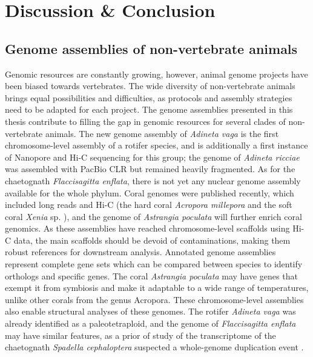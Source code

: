 \chapter{Discussion \& Conclusion}

\section{Genome assemblies of non-vertebrate animals}

Genomic resources are constantly growing, however, animal genome projects have been biased towards vertebrates. The wide diversity of non-vertebrate animals brings equal possibilities and difficulties, as protocols and assembly strategies need to be adapted for each project. The genome assemblies presented in this thesis contribute to filling the gap in genomic resources for several clades of non-vertebrate animals. The new genome assembly of \textit{Adineta vaga} is the first chromosome-level assembly of a rotifer species, and is additionally a first instance of Nanopore and Hi-C sequencing for this group; the genome of \textit{Adineta ricciae} \cite{adineta_ricciae} was assembled with PacBio CLR but remained heavily fragmented. As for the chaetognath \textit{Flaccisagitta enflata}, there is not yet any nuclear genome assembly available for the whole phylum. Coral genomes were published recently, which included long reads and Hi-C (the hard coral \textit{Acropora millepora} \cite{acropora_millepora2, hic_genomes} and the soft coral \textit{Xenia} sp. \cite{xenia_sp}), and the genome of \textit{Astrangia poculata} will further enrich coral genomics. As these assemblies have reached chromosome-level scaffolds using Hi-C data, the main scaffolds should be devoid of contaminations, making them robust references for downstream analysis. Annotated genome assemblies represent complete gene sets which can be compared between species to identify orthologs and specific genes. The coral \textit{Astrangia poculata} may have genes that exempt it from symbiosis and make it adaptable to a wide range of temperatures, unlike other corals from the genus Acropora. These chromosome-level assemblies also enable structural analyses of these genomes. The rotifer \textit{Adineta vaga} was already identified as a paleotetraploid, and the genome of \textit{Flaccisagitta enflata} may have similar features, as a prior of study of the transcriptome of the chaetognath \textit{Spadella cephaloptera} suspected a whole-genome duplication event \cite{marletaz2008chaetognath}. \\

